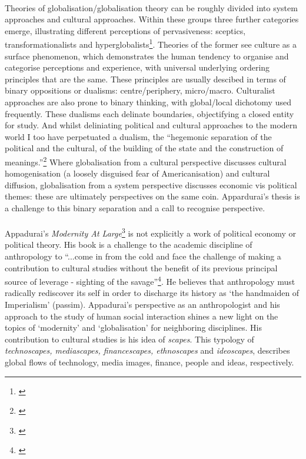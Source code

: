 \documentclass{article}
\begin{document}
\paragraph{}Theories of globalisation/globalisation theory can be roughly divided into system approaches and cultural approaches. Within these groups three further categories emerge, illustrating different perceptions of pervasiveness: sceptics, transformationalists and hyperglobalists\footnote{\cite[p.120-121]{Hoogvelt:2001gp}}. Theories of the former see culture as a surface phenomenon,  which demonstrates the human tendency to organise and categorise perceptions and experience, with universal underlying ordering principles that are the same. These principles are usually descibed in terms of binary oppositions or dualisms: centre/periphery, micro/macro. Culturalist approaches are also prone to binary thinking, with global/local dichotomy used frequently. These dualisms each delinate boundaries, objectifying a closed entity for study. And whilst deliniating political and cultural approaches to the modern world I too have perpetuated a dualism, the ``hegemonic separation of the political and the cultural, of the building of the state and the construction of meanings.''\footnote{\cite[p.81]{Krohn:2003}} Where globalisation from a cultural perspective discusses cultural homogenisation (a loosely disguised fear of Americanisation) and cultural diffusion, globalisation from a system perspective discusses economic vis political themes: these are ultimately perspectives on the same coin. Appardurai's thesis is a challenge to this binary separation and a call to recognise perspective.

\paragraph{}Appadurai's \emph{Modernity At Large}\footnote{\cite{Appadurai:1996lp}} is not explicitly a work of political economy or political theory. His book is a challenge to the academic discipline of anthropology to ``...come in from the cold and face the challenge of making a contribution to cultural studies without the benefit of its previous principal source of leverage - sighting of the savage''\footnote{\cite[p.65]{Appadurai:1996lp}}. He believes that anthropology must radically rediscover its self in order to discharge its history as `the handmaiden of Imperialism' (passim). Appadurai's perspective as an anthropologist and his approach to the study of human social interaction shines a new light on the topics of `modernity' and `globalisation' for neighboring disciplines. His contribution to cultural studies is his idea of \emph{scapes}. This typology of \emph{technoscapes, mediascapes, financescapes, ethnoscapes} and \emph{ideoscapes}, describes global flows of technology, media images, finance, people and ideas, respectively.
\end{document}

